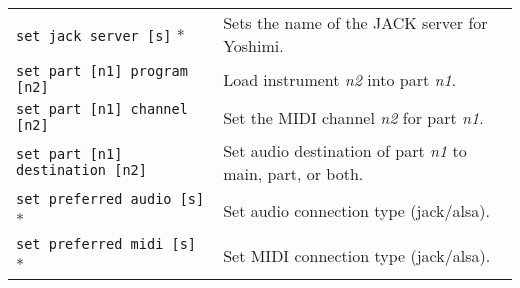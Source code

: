 \begin{table}[H]
\begin{tabular}{l l}
         \texttt{set jack server [s]} * &
            Sets the name of the JACK server for Yoshimi. \\

         \texttt{set part [n1] program [n2]} &
            Load instrument \textsl{n2} into part \textsl{n1}. \\

         \texttt{set part [n1] channel [n2]} &
            Set the MIDI channel \textsl{n2} for part \textsl{n1}. \\

         \texttt{set part [n1] destination [n2]} &
            Set audio destination of part \textsl{n1}
            to main, part, or both. \\

         \texttt{set preferred audio [s]} * &
            Set audio connection type (jack/alsa). \\

         \texttt{set preferred midi [s]} * &
            Set MIDI connection type (jack/alsa). \\

      \end{tabular}
   \end{table}

